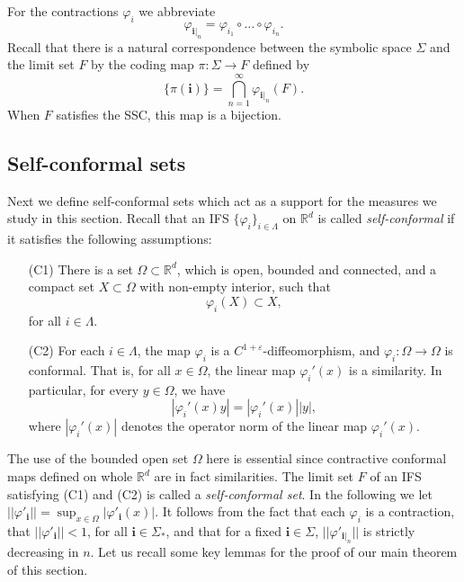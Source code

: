 \documentclass{PRM}
\newcommand{\field}[1]{\mathbb{#1}}
\newcommand{\R}{\field{R}}
\theoremstyle{plain}
\theoremstyle{definition}
\theoremstyle{remark}
\begin{document}
For the contractions $\varphi_i$ we abbreviate
\begin{equation*}
    \varphi_{\mathbf{i}|_n}=\varphi_{i_1}\circ\ldots\circ \varphi_{i_n}.
\end{equation*}
Recall that there is a natural correspondence between the symbolic space $\Sigma$ and the limit set $F$ by the coding map $\pi:\Sigma\to F$ defined by
\begin{equation}\label{eq:code_map}
    \{\pi(\mathbf{i})\}=\bigcap_{n=1}^{\infty}\varphi_{\mathbf{i}|_n}(F).
\end{equation}
When $F$ satisfies the SSC, this map is a bijection.

\subsection{Self-conformal sets}\label{subsec:self-conformal}

Next we define self-conformal sets which act as a support for the measures we study in this section. Recall that an IFS $\{\varphi_i\}_{i\in\Lambda}$ on $\R^d$ is called \emph{self-conformal} if it satisfies the following assumptions:

\begin{enumerate}
    \item[(C1)] There is a set $\Omega\subset \R^d$, which is open, bounded and connected, and a compact set $X\subset\Omega$ with non-empty interior, such that
    \begin{equation*}
        \varphi_{i}(X)\subset X,
    \end{equation*}
    for all $i\in\Lambda$.
    \item[(C2)] For each $i\in\Lambda$, the map $\varphi_i$ is a $C^{1+\varepsilon}$-diffeomorphism, and $\varphi_i\colon \Omega\to\Omega$ is conformal. That is, for all $x\in\Omega$, the linear map $\varphi_i'(x)$ is a similarity. In particular, for every $y\in \Omega$, we have
    \begin{equation*}
        |\varphi_i'(x)y|= |\varphi_i'(x)||y|,
    \end{equation*}
    where $|\varphi_i'(x)|$ denotes the operator norm of the linear map $\varphi_i'(x)$.
\end{enumerate}
The use of the bounded open set $\Omega$ here is essential since contractive conformal maps defined on whole $\R^d$ are in fact similarities. The limit set $F$ of an IFS satisfying (C1) and (C2) is called a \emph{self-conformal set}. In the following we let $||\varphi'_{\mathbf{i}}||=\sup_{x\in \Omega}|\varphi'_{\mathbf{i}}(x)|$. It follows from the fact that each $\varphi_i$ is a contraction, that $||\varphi'_{\mathbf{i}}||<1$, for all $\mathbf{i}\in\Sigma_*$, and that for a fixed $\mathbf{i}\in\Sigma$, $||\varphi'_{\mathbf{i}|_n}||$ is strictly decreasing in $n$. Let us recall some key lemmas for the proof of our main theorem of this section.
\end{document}
